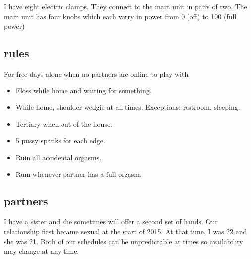 \documentclass{article}
\begin{document}
I have eight electric clamps.
They connect to the main unit in pairs of two.
The main unit has four knobs which each varry in power from 0 (off) to 100 (full power)

\subsection{rules}

For free days alone when no partners are online to play with.

\begin{itemize}
    \item Floss while home and waiting for something.
    \item While home, shoulder wedgie at all times. Exceptions: restroom, sleeping.
    \item Tertiary when out of the house.
    \item 5 pussy spanks for each edge.
    \item Ruin all accidental orgasms.
    \item Ruin whenever partner has a full orgasm.
\end{itemize}

\subsection{partners}

I have a sister and she sometimes will offer a second set of hands.
Our relationship first became sexual at the start of 2015.
At that time, I was 22 and she was 21.
Both of our schedules can be unpredictable at times so availability may change at any time.
\end{document}
